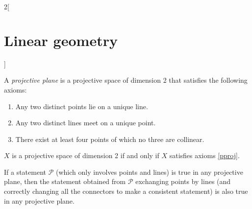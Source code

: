 \documentclass[../../../main.tex]{subfiles}
\begin{document}
\begin{multicols}{2}[\section{Linear geometry}]
\begin{definition}
    \end{definition}
    \begin{definition}
        \label{pproj}
        A \textit{projective plane} is a projective space of dimension 2 that satisfies the following axioms:
        \begin{enumerate}
            \item Any two distinct points lie on a unique line.
            \item Any two distinct lines meet on a unique point.
            \item There exist at least four points of which no three are collinear.
        \end{enumerate}
    \end{definition}
    \begin{theorem}
        $X$ is a projective space of dimension 2 if and only if $X$ satisfies axioms \ref{pproj}.
    \end{theorem}
    \begin{theorem}
        If a statement $\mathcal{P}$ (which only involves points and lines) is true in any projective plane, then the statement obtained from $\mathcal{P}$ exchanging points by lines (and correctly changing all the connectors to make a consistent statement) is also true in any projective plane.
    \end{theorem}

\end{multicols}
\end{document}
